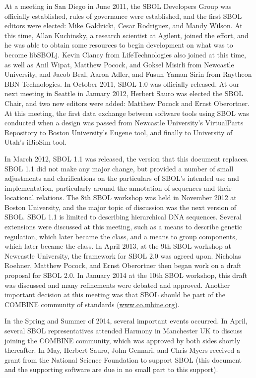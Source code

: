 At a meeting in San Diego in June 2011, the SBOL Developers Group was officially established, rules of governance were established, and the first SBOL editors were elected: Mike Galdzicki, Cesar Rodriguez, and Mandy Wilson.  
At this time, Allan Kuchinsky, a research scientist at Agilent, joined the effort, and he was able to obtain some resources to begin development on what was to become libSBOLj.  
Kevin Clancy from LifeTechnologies also joined at this time, as well as Anil Wipat, Matthew Pocock, and Goksel Misirli from Newcastle University, and Jacob Beal, Aaron Adler, and Fusun Yaman Sirin from Raytheon BBN Technologies.  
In October 2011, SBOL 1.0 was officially released.  At our next meeting in Seattle in January 2012, Herbert Sauro was elected the SBOL Chair, and two new editors were added: Matthew Pocock and Ernst Oberortner.  
At this meeting, the first data exchange between software tools using SBOL was conducted when a design was passed from Newcastle University's VirtualParts Repository to Boston University's Eugene tool, and finally to University of Utah's iBioSim tool. 

In March 2012, SBOL 1.1 was released, the version that this document replaces. 
SBOL 1.1 did not make any major change, but provided a number of small adjustments and clarifications on the particulars of SBOL's intended use and implementation, particularly around the annotation of sequences and their locational relations.
The 8th SBOL workshop was held in November 2012 at Boston University, and the major topic of discussion was the next version of SBOL.  SBOL 1.1 is limited to describing hierarchical DNA sequences.  
Several extensions were discussed at this meeting, such as a means to describe genetic regulation, which later became the  class, and a means to group components, which later became the  class.  
In April 2013, at the 9th SBOL workshop at Newcastle University, the framework for SBOL 2.0 was agreed upon.  
Nicholas Roehner, Matthew Pocock, and Ernst Oberortner then began work on a draft proposal for SBOL 2.0.  In January 2014 at the 10th SBOL workshop, this draft was discussed and many refinements were debated and approved.  
Another important decision at this meeting was that SBOL should be part of the COMBINE community of standards (\url{www.co.mbine.org}). 

In the Spring and Summer of 2014, several important events occurred.  In April, several SBOL representatives attended Harmony in Manchester UK to discuss joining the COMBINE community, which was approved by both sides shortly thereafter.  In May, Herbert Sauro, John Gennari, and Chris Myers received a grant from the National Science Foundation to support SBOL (this document and the supporting software are due in no small part to this support).  

